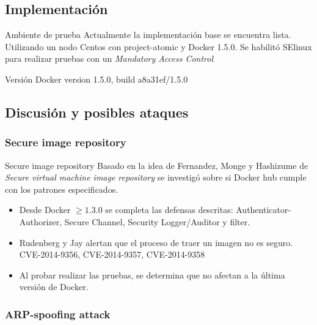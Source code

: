 \documentclass{bredelebeamer}
\begin{document}
\subsection{Implementación}


\begin{frame}{Ambiente de prueba}
	Actualmente la implementación base se encuentra lista. Utilizando un nodo
Centos con project-atomic y Docker 1.5.0. Se habilitó SElinux para
realizar pruebas con un \textit{Mandatory Access Control}

\begin{block}{Versión}
	Docker version 1.5.0, build a8a31ef/1.5.0

\end{block}
\end{frame}


\subsection{Discusión y posibles ataques}

\subsubsection{Secure image repository}
\begin{frame}{Secure image repository}
Basado en la idea de Fernandez, Monge y Hashizume  de \textit{Secure
virtual machine image repository} \cite{fernandez_monge:2015} se investigó sobre si Docker hub cumple con los patrones especificados.
 \begin{itemize}
 	\item Desde Docker \(\geq 1.3.0\) se completa las defensas descritas:  Authenticator-Authorizer, Secure Channel, Security Logger/Auditor y filter.
 	\item Rudenberg \cite{rudenberg:2015:Online} y Jay \cite{jay:2014:Online} alertan que el proceso de traer un imagen no es seguro. CVE-2014-9356, CVE-2014-9357, CVE-2014-9358 \cite{lvm-cve:2014:Online}
	\item Al probar realizar las pruebas, se determina que no afectan a la última versión de Docker.
 	
 \end{itemize}

	  
\end{frame}
\subsubsection{ARP-spoofing attack}
\end{document}
